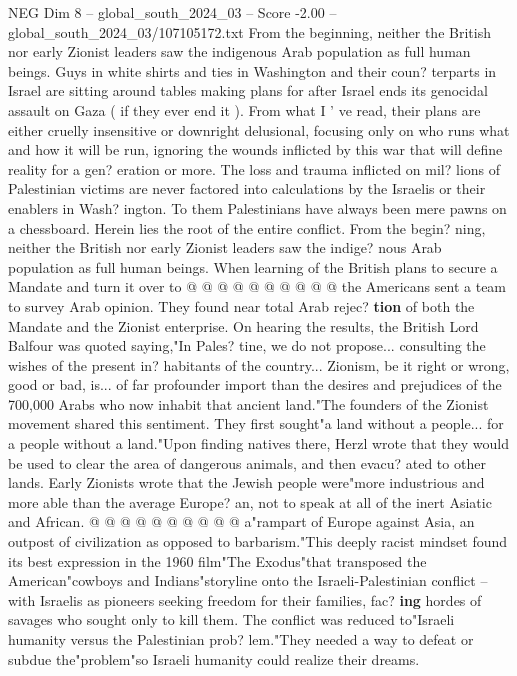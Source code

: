 \begin{textsample}{NEG Dim 8 – global\_south\_2024\_03 – Score -2.00 – global\_south\_2024\_03/107105172.txt}  \label{ex:f8_neg_019}
From the beginning, neither the British nor early Zionist leaders saw the indigenous Arab population as full human beings.
Guys in white shirts and ties in Washington and their coun? terparts in Israel are sitting around tables making plans for after Israel ends its genocidal assault on Gaza ( if they ever end it ).
From what I ' ve read, their plans are either cruelly insensitive or downright delusional, focusing only on who runs what and how it will be run, ignoring the wounds inflicted by this war that will define reality for a gen? eration or more.
The loss and trauma inflicted on mil? lions of Palestinian victims are never factored into calculations by the Israelis or their enablers in Wash? ington.
To them Palestinians have always been mere pawns on a chessboard.
Herein lies the root of the entire conflict.
From the begin? ning, neither the British nor early Zionist leaders saw the indige? nous Arab population as full human beings.
When learning of the British plans to secure a Mandate and turn it over to @ @ @ @ @ @ @ @ @ @ the Americans sent a team to survey Arab opinion.
They found near total Arab rejec? \textbf{tion} of both the Mandate and the Zionist enterprise.
On hearing the results, the British Lord Balfour was quoted saying,"In Pales? tine, we do not propose... consulting the wishes of the present in? habitants of the country...
Zionism, be it right or wrong, good or bad, is... of far profounder import than the desires and prejudices of the 700,000 Arabs who now inhabit that ancient land."The founders of the Zionist movement shared this sentiment.
They first sought"a land without a people... for a people without a land."Upon finding natives there, Herzl wrote that they would be used to clear the area of dangerous animals, and then evacu? ated to other lands.
Early Zionists wrote that the Jewish people were"more industrious and more able than the average Europe? an, not to speak at all of the inert Asiatic and African. @ @ @ @ @ @ @ @ @ @ a"rampart of Europe against Asia, an outpost of civilization as opposed to barbarism."This deeply racist mindset found its best expression in the 1960 film"The Exodus"that transposed the American"cowboys and Indians"storyline onto the Israeli-Palestinian conflict -- with Israelis as pioneers seeking freedom for their families, fac? \textbf{ing} hordes of savages who sought only to kill them.
The conflict was reduced to"Israeli humanity versus the Palestinian prob? lem."They needed a way to defeat or subdue the"problem"so Israeli humanity could realize their dreams.

\end{textsample}
